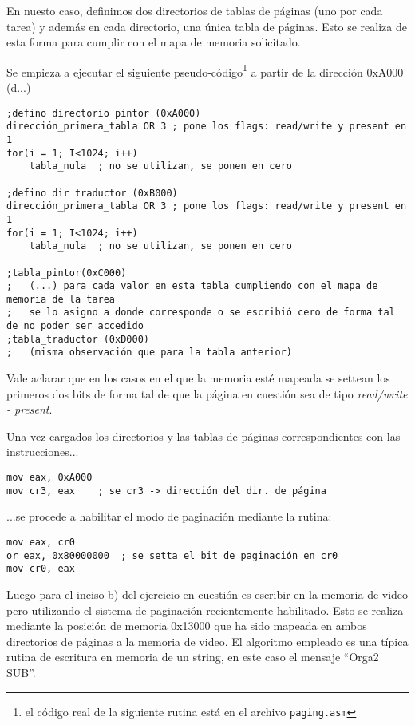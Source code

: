 En nuesto caso, definimos dos directorios de tablas de páginas (uno por cada tarea) y además en cada directorio, una única tabla de páginas. Esto se realiza de esta forma para cumplir con el mapa de memoria solicitado.

Se empieza a ejecutar el siguiente pseudo-código\footnote{el código real de la siguiente rutina está en el archivo \texttt{paging.asm}} a partir de la dirección 0xA000 (d...)

\pagebreak

\begin{verbatim}
;defino directorio pintor (0xA000)
dirección_primera_tabla OR 3 ; pone los flags: read/write y present en 1
for(i = 1; I<1024; i++)
	tabla_nula	; no se utilizan, se ponen en cero

;defino dir traductor (0xB000)
dirección_primera_tabla OR 3 ; pone los flags: read/write y present en 1
for(i = 1; I<1024; i++)
	tabla_nula	; no se utilizan, se ponen en cero

;tabla_pintor(0xC000)
;	(...) para cada valor en esta tabla cumpliendo con el mapa de memoria de la tarea
;	se lo asigno a donde corresponde o se escribió cero de forma tal de no poder ser accedido
;tabla_traductor (0xD000)
;	(misma observación que para la tabla anterior)
\end{verbatim}


Vale aclarar que en los casos en el que la memoria esté mapeada se settean los primeros dos bits de forma tal de que la página en cuestión sea de tipo \emph{read/write - present}.

Una vez cargados los directorios y las tablas de páginas correspondientes con las instrucciones...
\begin{verbatim}
mov eax, 0xA000 
mov cr3, eax	; se cr3 -> dirección del dir. de página
\end{verbatim}

...se procede a habilitar el modo de paginación mediante la rutina:
\begin{verbatim}
mov eax, cr0
or eax, 0x80000000 	; se setta el bit de paginación en cr0
mov cr0, eax
\end{verbatim}

Luego para el inciso b) del ejercicio en cuestión es escribir en la memoria de video pero utilizando el sistema de paginación recientemente habilitado. Esto se realiza mediante la posición de memoria 0x13000 que ha sido mapeada en ambos directorios de páginas a la memoria de video. El algoritmo empleado es una típica rutina de escritura en memoria de un string, en este caso el mensaje ``Orga2 SUB''. 

